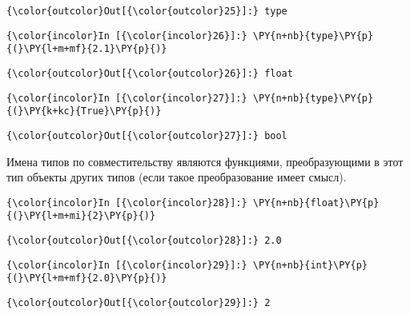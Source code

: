             \begin{Verbatim}[commandchars=\\\{\}]
{\color{outcolor}Out[{\color{outcolor}25}]:} type
\end{Verbatim}
        
    \begin{Verbatim}[commandchars=\\\{\}]
{\color{incolor}In [{\color{incolor}26}]:} \PY{n+nb}{type}\PY{p}{(}\PY{l+m+mf}{2.1}\PY{p}{)}
\end{Verbatim}

            \begin{Verbatim}[commandchars=\\\{\}]
{\color{outcolor}Out[{\color{outcolor}26}]:} float
\end{Verbatim}
        
    \begin{Verbatim}[commandchars=\\\{\}]
{\color{incolor}In [{\color{incolor}27}]:} \PY{n+nb}{type}\PY{p}{(}\PY{k+kc}{True}\PY{p}{)}
\end{Verbatim}

            \begin{Verbatim}[commandchars=\\\{\}]
{\color{outcolor}Out[{\color{outcolor}27}]:} bool
\end{Verbatim}
        
    Имена типов по совместительству являются функциями, преобразующими в
этот тип объекты других типов (если такое преобразование имеет смысл).

    \begin{Verbatim}[commandchars=\\\{\}]
{\color{incolor}In [{\color{incolor}28}]:} \PY{n+nb}{float}\PY{p}{(}\PY{l+m+mi}{2}\PY{p}{)}
\end{Verbatim}

            \begin{Verbatim}[commandchars=\\\{\}]
{\color{outcolor}Out[{\color{outcolor}28}]:} 2.0
\end{Verbatim}
        
    \begin{Verbatim}[commandchars=\\\{\}]
{\color{incolor}In [{\color{incolor}29}]:} \PY{n+nb}{int}\PY{p}{(}\PY{l+m+mf}{2.0}\PY{p}{)}
\end{Verbatim}

            \begin{Verbatim}[commandchars=\\\{\}]
{\color{outcolor}Out[{\color{outcolor}29}]:} 2
\end{Verbatim}
        
